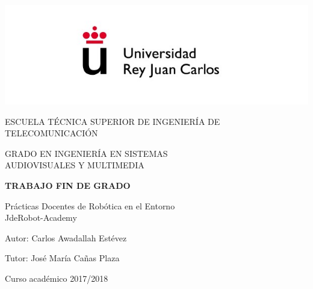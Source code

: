 \begin{titlepage}
	\begin{center}
		\vspace*{3mm}
		\begin{center}
			\includegraphics[width=0.4\linewidth]{figures/logo.jpg}
		\end{center}
		\vspace{6.5mm}
		
		\fontsize{15.5}{14}\selectfont ESCUELA TÉCNICA SUPERIOR DE INGENIERÍA DE TELECOMUNICACIÓN
		\vspace{13mm}
		
		\fontsize{14}{14}\selectfont GRADO EN INGENIERÍA EN SISTEMAS \\ AUDIOVISUALES Y MULTIMEDIA
		
		\vspace{70pt}
		
		\fontsize{15.7}{14}\selectfont \textbf{TRABAJO FIN DE GRADO} 
		
		\vspace{25mm}
		\begin{huge}
			Prácticas Docentes de Robótica en el Entorno \\ \vspace{0.4cm} JdeRobot-Academy
		\end{huge}
		
		\vspace{25mm}
		
		\begin{large}
			Autor: Carlos Awadallah Estévez
			
			Tutor: José María Cañas Plaza
			
			\vspace{10mm}
		\end{large}
		\begin{normalsize}
			Curso académico 2017/2018		
		\end{normalsize}
		\vspace{10mm}
		
	\end{center}
	
\end{titlepage}


